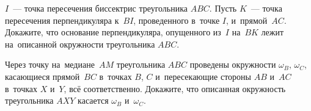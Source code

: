 \begin{problems}
\item
$I$~--- точка пересечения биссектрис треугольника $ABC$.
Пусть $K$~--- точка пересечения перпендикуляра к~$BI$, проведенного в~точке
$I$, и~прямой~$AC$.
Докажите, что основание перпендикуляра, опущенного из~$I$ на~$BK$ лежит
на~описанной окружности треугольника $ABC$.

\item 
Через точку на~медиане~$AM$ треугольника $ABC$ проведены окружности
$\omega_B$, $\omega_C$, касающиеся прямой~$BC$ в~точках $B$, $C$ и~пересекающие
стороны $AB$ и~$AC$ в~точках $X$ и~$Y$, всё соответственно.
Докажите, что описанная окружность треугольника $AXY$ касается $\omega_B$
и~$\omega_C$.

\end{problems}

